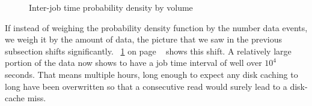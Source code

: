 \begin{figure}
\centering
{}
\hspace{0mm}
\caption{Inter-job time probability density by volume}
\label{fig:InterJobBySize}
\end{figure}
If instead of weighing the probability density function by the number data events, we weigh it by the amount of data, the picture that we saw in the previous subsection shifts significantly. ~\ref{fig:InterJobBySize} on page ~\pageref{fig:InterjobBySize} shows this shift. A relatively large portion of the data now shows to have a job time interval of well over $10^4$ seconds. That means multiple hours, long enough to expect any disk caching to long have been overwritten so that a consecutive read would surely lead to a disk-cache miss.

